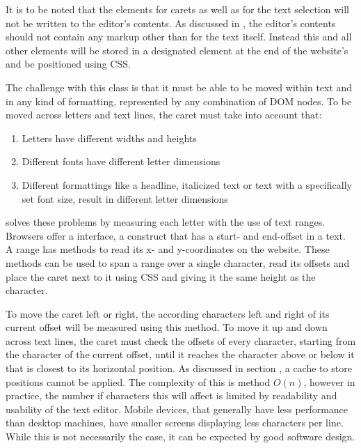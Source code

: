 It is to be noted that the elements for carets as well as for the text selection will not be written to the editor's contents. As discussed in , the editor's contents should not contain any markup other than for the text itself. Instead this and all other elements will be stored in a designated  element at the end of the website's  and be positioned using CSS.

 The challenge with this class is that it must be able to be moved within text and in any kind of formatting, represented by any combination of DOM nodes. To be moved across letters and text lines, the caret must take into account that:

\begin{enumerate}
\item Letters have different widths and heights
\item Different fonts have different letter dimensions
\item Different formattings like a headline, italicized text or text with a specifically set font size, result in different letter dimensions
\end{enumerate}

 solves these problems by measuring each letter with the use of text ranges. Browsers offer a  interface, a construct that has a start- and end-offset in a text. A range has methods to read its x- and y-coordinates on the website. These methods can be used to span a range over a single character, read its offsets and place the caret next to it using CSS and giving it the same height as the character.

To move the caret left or right, the according characters left and right of its current offset will be measured using this method. To move it up and down across text lines, the caret must check the offsets of every character, starting from the character of the current offset, until it reaches the character above or below it that is closest to its horizontal position. As discussed in section , a cache to store positions cannot be applied. The complexity of this is method $O(n)$, however in practice, the number if characters this will affect is limited by readability and usability of the text editor. Mobile devices, that generally have less performance than desktop machines, have smaller screens displaying less characters per line. While this is not necessarily the case, it can be expected by good software design.

